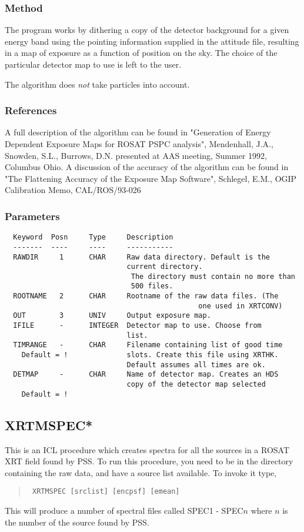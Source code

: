 \documentclass{book}
\renewcommand{\_}{{\tt\char'137}}     %
\begin{document}
\subsubsection{Method}
The program works by dithering a copy of the detector background for
a given energy band using the pointing information supplied in the
attitude file, resulting in a map of exposure as a function of
position on the sky. The choice of the particular detector map to use
is left to the user.

The algorithm does {\em not} take particles into account.

\subsubsection{References}
A full description of the algorithm can be found in
"Generation of Energy Dependent Exposure Maps for
ROSAT PSPC analysis", Mendenhall, J.A., Snowden, S.L., Burrows, D.N.
presented at AAS meeting, Summer 1992, Columbus Ohio.
A discussion of the accuracy of the algorithm can be found in
"The Flattening Accuracy of the Exposure Map Software",
Schlegel, E.M., OGIP Calibration Memo, CAL/ROS/93-026
\subsubsection{Parameters}
\begin{verbatim}
  Keyword  Posn     Type     Description
  -------  ----     ----     -----------
  RAWDIR     1      CHAR     Raw data directory. Default is the
                             current directory.
                              The directory must contain no more than
                              500 files.
  ROOTNAME   2      CHAR     Rootname of the raw data files. (The
                                              one used in XRTCONV)
  OUT        3      UNIV     Output exposure map.
  IFILE      -      INTEGER  Detector map to use. Choose from
                             list.
  TIMRANGE   -      CHAR     Filename containing list of good time
    Default = !              slots. Create this file using XRTHK.
                             Default assumes all times are ok.
  DETMAP     -      CHAR     Name of detector map. Creates an HDS
                             copy of the detector map selected
    Default = !

\end{verbatim}\subsection{XRTMSPEC*}
This is an ICL procedure which creates spectra for all the sources
in a ROSAT XRT field found by PSS. To run this procedure, you need
to be in the directory containing the raw data, and have a source
list available.
To invoke it type,
\begin{quote}\begin{verbatim}
 XRTMSPEC [srclist] [encpsf] [emean]
\end{verbatim}\end{quote}
This will produce a number of spectral files called SPEC1 -
SPEC$n$
where $n$ is the number of the source found by PSS.
\end{document}
